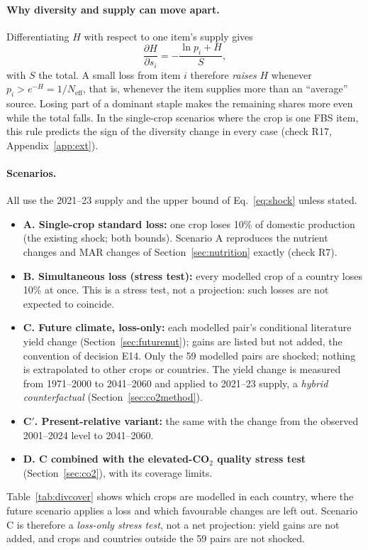 \paragraph{Why diversity and supply can move apart.} Differentiating $H$ with respect to one item's supply gives
\begin{equation}\label{eq:divrule}
\frac{\partial H}{\partial s_i}=-\frac{\ln p_i+H}{S},
\end{equation}
with $S$ the total. A small loss from item $i$ therefore \emph{raises} $H$ whenever $p_i>e^{-H}=1/N_{\text{eff}}$, that
is, whenever the item supplies more than an ``average'' source. Losing part of a dominant staple makes the
remaining shares more even while the total falls. In the single-crop scenarios where the crop is one FBS item, this
rule predicts the sign of the diversity change in every case (check R17, Appendix~\ref{app:ext}).

\paragraph{Scenarios.} All use the 2021--23 supply and the upper bound of Eq.~\ref{eq:shock} unless stated.
\begin{itemize}
\item \textbf{A. Single-crop standard loss:} one crop loses 10\% of domestic production (the existing shock; both
bounds). Scenario A reproduces the nutrient changes and MAR changes of Section~\ref{sec:nutrition} exactly (check R7).
\item \textbf{B. Simultaneous loss (stress test):} every modelled crop of a country loses 10\% at once. This is a
stress test, not a projection: such losses are not expected to coincide.
\item \textbf{C. Future climate, loss-only:} each modelled pair's conditional literature yield change
(Section~\ref{sec:futurenut}); gains are listed but not added, the convention of decision E14. Only the 59 modelled
pairs are shocked; nothing is extrapolated to other crops or countries. The yield change is measured from
1971--2000 to 2041--2060 and applied to 2021--23 supply, a \emph{hybrid counterfactual} (Section~\ref{sec:co2method}).
\item \textbf{C$'$. Present-relative variant:} the same with the change from the observed 2001--2024 level to
2041--2060.
\item \textbf{D. C combined with the elevated-CO$_2$ quality stress test} (Section~\ref{sec:co2}), with its coverage
limits.
\end{itemize}
Table~\ref{tab:divcover} shows which crops are modelled in each country, where the future scenario applies a loss and
which favourable changes are left out. Scenario C is therefore a \emph{loss-only stress test}, not a net projection:
yield gains are not added, and crops and countries outside the 59 pairs are not shocked.

